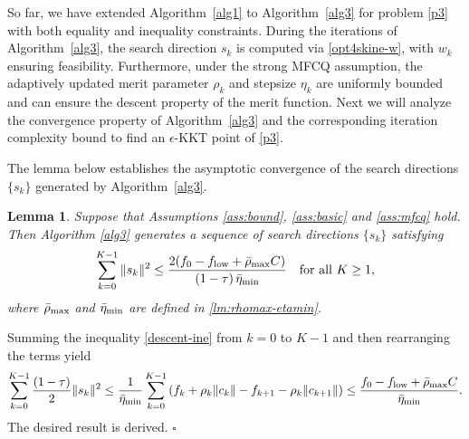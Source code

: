\documentclass[11pt]{article}
\newenvironment{proof}{{\noindent\it Proof.}\quad}{\hfill $\square$\par}
\newtheorem{lemma}{Lemma}
\begin{document}
So far, {we have extended Algorithm~\ref{alg1} to Algorithm~\ref{alg3} for problem \eqref{p3} with both equality and inequality constraints.} During the iterations of Algorithm~\ref{alg3}, the search direction $s_k$ is computed via  \eqref{opt4skine-w}, with $w_k$  ensuring feasibility.  Furthermore, under the strong MFCQ assumption, the adaptively updated  merit parameter $\rho_k$ and stepsize $\eta_k$ are uniformly bounded and  can ensure the descent property of the merit function. Next we will analyze   the convergence {property} of Algorithm~\ref{alg3} and the corresponding  iteration complexity bound to find an $\epsilon$-KKT point of \eqref{p3}.



The lemma below establishes the asymptotic convergence of the search directions $  \{ s_k \}  $ generated by  Algorithm~\ref{alg3}. 
\begin{lemma}\label{thm:det-convergence-2}
    Suppose that Assumptions \ref{ass:bound}, \ref{ass:basic} and \ref{ass:mfcq} hold. 
    Then Algorithm \ref{alg3} generates a sequence of search directions \(\{s_k\}\) satisfying
    \begin{align*}
     \sum_{k=0}^{K-1} \|s_k\|^2 
    \leq \frac{2(f_0 - f_{\rm low}+\bar \rho_{\rm max} C)}{\left(1-\tau\right)\bar \eta_{\rm min} }\quad \mbox{for all } K\ge 1, 
    \end{align*}
    where $\bar \rho_{\rm max} $ and $\bar \eta_{\rm min} $ are defined in \eqref{lm:rhomax-etamin}.
\end{lemma}
\begin{proof}
    Summing the inequality \eqref{descent-ine} from \(k=0\) to \(K-1\) and then rearranging the terms yield  
    \begin{align*}
    \sum_{k=0}^{K-1} \frac{\left(1-\tau\right)}{2} \|s_k\|^2 \leq \frac{1}{\bar \eta_{\rm min} } \sum_{k=0}^{K-1} \left(f_k+\rho_k \|c_k\| - f_{k+1} - \rho_k \|c_{k+1}\|\right)
    \leq \frac{f_0 - f_{\rm low}+\bar \rho_{\rm max} C}{\bar \eta_{\rm min} }.
    \end{align*}
    The desired result is derived.
\end{proof}
\end{document}
